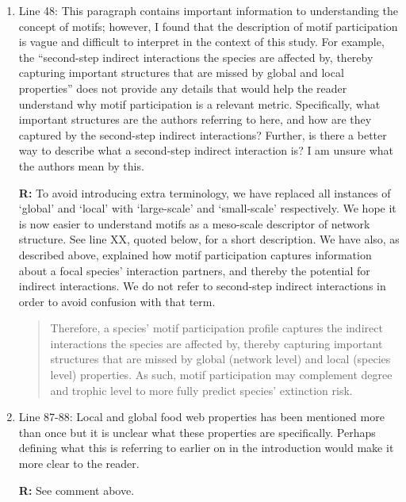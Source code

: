 \documentclass[12pt]{article}
\begin{document}
\begin{enumerate}
            \item Line 48: This paragraph contains important information to understanding the concept of motifs; however, I found that the description of motif participation is vague and difficult to interpret in the context of this study. For example, the “second-step indirect interactions the species are affected by, thereby capturing important structures that are missed by global and local properties” does not provide any details that would help the reader understand why motif participation is a relevant metric. Specifically, what important structures are the authors referring to here, and how are they captured by the second-step indirect interactions? Further, is there a better way to describe what a second-step indirect interaction is? I am unsure what the authors mean by this.

                \textbf{R:} To avoid introducing extra terminology, we have replaced all instances of `global' and `local' with `large-scale' and `small-scale' respectively. We hope it is now easier to understand motifs as a meso-scale descriptor of network structure. See line XX, quoted below, for a short description. We have also, as described above, explained how motif participation captures information about a focal species' interaction partners, and thereby the potential for indirect interactions. We do not refer to second-step indirect interactions in order to avoid confusion with that term.


                \begin{quotation}
                Therefore, a species' motif participation profile captures the indirect interactions the species are affected by, thereby capturing important structures that are missed by global (network level) and local (species level) properties.  As such, motif participation may complement degree and trophic level to more fully predict species' extinction risk.
                \end{quotation}
            
            \item Line 87-88: Local and global food web properties has been mentioned more than once but it is unclear what these properties are specifically. Perhaps defining what this is referring to earlier on in the introduction would make it more clear to the reader.

                \textbf{R:} See comment above. 


\end{enumerate}
\end{document}
